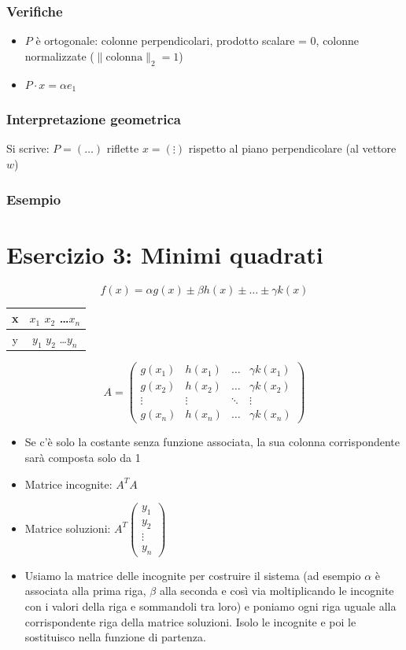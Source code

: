 \documentclass[10pt]{article}
\begin{document}
\subsubsection{Verifiche}
\begin{itemize}
    \item $P$ è ortogonale: colonne perpendicolari, prodotto scalare = 0, colonne normalizzate ($\lVert\text{colonna}\rVert_{2}=1$)
    \item $P\cdot x = \alpha e_{1}$
\end{itemize}
\subsubsection{Interpretazione geometrica}
Si scrive: $P=(\ldots)$ riflette $x=\left(\vdots\right)$ rispetto al piano perpendicolare (al vettore $w$)
\subsubsection*{Esempio}
\section*{Esercizio 3: Minimi quadrati}
\begin{equation*}
    f(x) = \alpha g(x)\pm \beta h(x) \pm \ldots \pm \gamma k(x)
\end{equation*}
\begin{tabular}{c | c}
    x & $x_{1}$ $x_{2}$ \ldots $x_{n}$\\
    \hline
    y & $y_{1}$ $y_{2}$ \ldots $y_{n}$
\end{tabular}
\begin{equation*}
    A =
    \begin{pmatrix}
        g(x_{1}) & h(x_{1}) & \ldots & \gamma k(x_{1})\\
        g(x_{2}) & h(x_{2}) & \ldots & \gamma k(x_{2})\\
        \vdots & \vdots & \ddots & \vdots\\
        g(x_{n}) & h(x_{n}) & \ldots & \gamma k(x_{n})
    \end{pmatrix}
\end{equation*}
\begin{itemize}
    \item Se c'è solo la costante senza funzione associata, la sua colonna corrispondente sarà composta solo da 1
    \item Matrice incognite: $A^{T}A$
    \item Matrice soluzioni: $A^{T}\begin{pmatrix}
        y_{1} \\ y_{2} \\ \vdots \\ y_{n}
    \end{pmatrix}$
    \item Usiamo la matrice delle incognite per costruire il sistema (ad esempio $\alpha$ è associata alla prima riga, $\beta$ alla seconda e così via moltiplicando le incognite con i valori della riga e sommandoli tra loro) e poniamo ogni riga uguale alla corrispondente riga della matrice soluzioni. Isolo le incognite e poi le sostituisco nella funzione di partenza.
\end{itemize}
\end{document}
